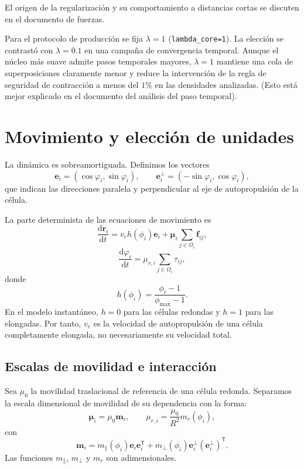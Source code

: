 \documentclass[11pt,a4paper]{article}
\begin{document}
El origen de la regularización y su comportamiento a distancias cortas se
discuten en el documento de fuerzas.

Para el protocolo de producción se fija $\lambda=1$
(\texttt{lambda\_core=1}). La elección se contrastó con
$\lambda=0.1$ en una campaña de convergencia temporal. Aunque el núcleo más
suave admite pasos temporales mayores, $\lambda=1$ mantiene una cola de
superposiciones claramente menor y reduce la intervención de la regla de
seguridad de contracción a menos del $1\%$ en las densidades analizadas. (Esto está mejor explicado en el documento del análisis del paso temporal).

\section{Movimiento y elección de unidades}

La dinámica es sobreamortiguada. Definimos los vectores
\begin{equation}
	\bm e_i=(\cos\varphi_i,\sin\varphi_i),
	\qquad
	\bm e_i^\perp=(-\sin\varphi_i,\cos\varphi_i),
\end{equation}
que indican las direcciones paralela y perpendicular al eje
de autopropulsión de la célula.

La parte determinista de las ecuaciones de movimiento es
\begin{equation}
	\frac{\mathrm{d}\bm r_i}{\mathrm{d}t}
	=
	v_e h(\phi_i)\bm e_i
	+
	\bm\mu_i
	\sum_{j\in\Omega_i}\bm f_{ij},
	\label{eq:dimensional_translation}
\end{equation}
\begin{equation}
	\frac{\mathrm{d}\varphi_i}{\mathrm{d}t}
	=
	\mu_{r,i}
	\sum_{j\in\Omega_i}\tau_{ij},
	\label{eq:dimensional_rotation}
\end{equation}
donde
\begin{equation}
	h(\phi_i)=\frac{\phi_i-1}{\phi_{\max}-1}.
\end{equation}
En el modelo instantáneo, $h=0$ para las células redondas
y $h=1$ para las elongadas. Por tanto, $v_e$ es la velocidad
de autopropulsión de una célula completamente elongada,
no necesariamente su velocidad total.

\subsection{Escalas de movilidad e interacción}

Sea $\mu_0$ la movilidad traslacional de referencia de una
célula redonda. Separamos la escala dimensional de movilidad
de su dependencia con la forma:
\begin{equation}
	\bm\mu_i=\mu_0\bm m_i,
	\qquad
	\mu_{r,i}=\frac{\mu_0}{R^2}m_r(\phi_i),
\end{equation}
con
\begin{equation}
	\bm m_i
	=
	m_\parallel(\phi_i)\bm e_i\bm e_i^{\mathsf T}
	+
	m_\perp(\phi_i)\bm e_i^\perp
	(\bm e_i^\perp)^{\mathsf T}.
\end{equation}
Las funciones $m_\parallel$, $m_\perp$ y $m_r$ son
adimensionales.
\end{document}
